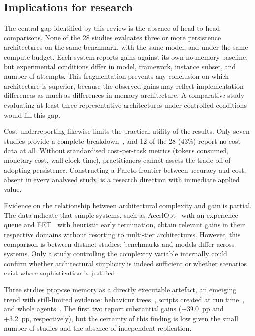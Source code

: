 \subsection{Implications for research}
\label{sec:implicacoes-pesquisa}

The central gap identified by this review is the absence of head-to-head
comparisons.
None of the 28 studies evaluates three or more persistence architectures
on the same benchmark, with the same model, and under the same compute
budget.
Each system reports gains against its own no-memory baseline, but
experimental conditions differ in model, framework, instance subset, and
number of attempts.
This fragmentation prevents any conclusion on which architecture is
superior, because the observed gains may reflect implementation
differences as much as differences in memory architecture.
A comparative study evaluating at least three representative
architectures under controlled conditions would fill this gap.

Cost underreporting likewise limits the practical utility of the
results.
Only seven studies provide a complete
breakdown~\citep{chen2025sweexp,guo2026eet,wang2026memgovern,wu2025gcc,xia2025livesweagent,zhang2025accelopt,zhou2025tomswe},
and 12 of the 28 (43\%) report no cost data at all.
Without standardised cost-per-task metrics (tokens consumed, monetary
cost, wall-clock time), practitioners cannot assess the trade-off of
adopting persistence.
Constructing a Pareto frontier between accuracy and cost, absent in
every analysed study, is a research direction with immediate applied
value.

Evidence on the relationship between architectural complexity and gain
is partial.
The data indicate that simple systems, such as
AccelOpt~\citep{zhang2025accelopt} with an experience queue and
EET~\citep{guo2026eet} with heuristic early termination, obtain
relevant gains in their respective domains without resorting to
multi-tier architectures.
However, this comparison is between distinct studies: benchmarks and
models differ across systems.
Only a study controlling the complexity variable internally could
confirm whether architectural simplicity is indeed sufficient or
whether scenarios exist where sophistication is justified.

Three studies propose memory as a directly executable artefact, an
emerging trend with still-limited evidence:
behaviour trees~\citep{li2026traversalaspolicy},
scripts created at run time~\citep{xia2025livesweagent}, and
whole agents~\citep{zhang2025darwingodel}.
The first two report substantial gains (+39.0~pp and +3.2~pp,
respectively), but the certainty of this finding is low given the
small number of studies and the absence of independent replication.


